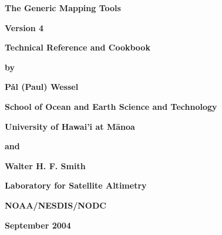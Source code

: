 %
%

\thispagestyle{empty}

\begin{center}
\huge
\textbf{The Generic Mapping Tools}\par 
\vspace{0.5\baselineskip}


\Huge
\textbf{Version 4}\par 
\vspace{0.25\baselineskip}

\huge
\textbf{Technical Reference and Cookbook}\par 

\large
\vspace{0.75\baselineskip}
\textbf{by}\par 
\vspace{0.75\baselineskip}

\huge
\textbf{P\aa l (Paul) Wessel}\par 
\vspace{0.5\baselineskip}

\Large
\textbf{School of Ocean and Earth Science and Technology}\par 
\textbf{University of Hawai'i at M\={a}noa}\par 

\large
\vspace{0.75\baselineskip}
\textbf{and}\par 
\vspace{0.75\baselineskip}

\huge
\textbf{Walter H. F. Smith}\par 
\vspace{0.5\baselineskip}

\Large
\textbf{Laboratory for Satellite Altimetry}\par 
\textbf{NOAA/NESDIS/NODC}\par 
\vspace{0.5\baselineskip}

\large
\textbf{September 2004}\par 
\vspace{\baselineskip}

\end{center}
